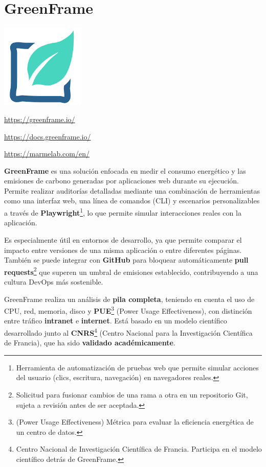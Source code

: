 \documentclass[12pt,a4paper]{report}
\begin{document}
\section*{\textbf{GreenFrame}}

\begin{center}
\includegraphics[width=0.3\textwidth]{imagenes/GreenFrame_Logo.png}
\end{center}

\url{https://greenframe.io/}

\url{https://docs.greenframe.io/}

\url{https://marmelab.com/en/}

\textbf{GreenFrame} es una solución enfocada en medir el consumo energético y las emisiones de carbono generadas por aplicaciones web durante su ejecución. Permite realizar auditorías detalladas mediante una combinación de herramientas como una interfaz web, una línea de comandos (CLI) y escenarios personalizables a través de \textbf{Playwright}\footnote{Herramienta de automatización de pruebas web que permite simular acciones del usuario (clics, escritura, navegación) en navegadores reales.}, lo que permite simular interacciones reales con la aplicación.

Es especialmente útil en entornos de desarrollo, ya que permite comparar el
impacto entre versiones de una misma aplicación o entre diferentes páginas.
También se puede integrar con \textbf{GitHub} para bloquear automáticamente \textbf{pull
  requests}\footnote{Solicitud para fusionar cambios de una rama a otra en un
  repositorio Git, sujeta a revisión antes de ser aceptada.} que superen un
umbral de emisiones establecido, contribuyendo a una cultura
DevOps más sostenible.

GreenFrame realiza un análisis de \textbf{pila completa}, teniendo en cuenta el
uso de CPU, red, memoria, disco y \textbf{PUE}\footnote{(Power Usage
  Effectiveness) Métrica para evaluar la eficiencia energética de un centro de
  datos.} (Power Usage Effectiveness), con distinción entre tráfico
\textbf{intranet} e \textbf{internet}. Está basado en un modelo científico
desarrollado junto al \textbf{CNRS}\footnote{Centro Nacional de Investigación
  Científica de Francia. Participa en el modelo científico detrás de GreenFrame.}
(Centro Nacional para la Investigación Científica de Francia), que ha sido
\textbf{validado académicamente}.
\end{document}
